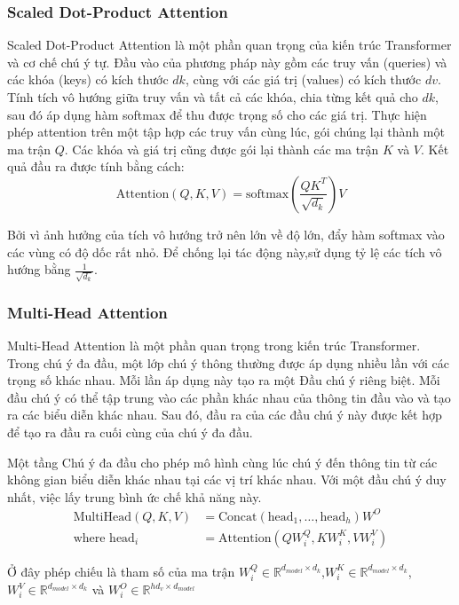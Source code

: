\subsubsection*{Scaled Dot-Product Attention}
Scaled Dot-Product Attention là một phần quan trọng của kiến trúc Transformer và cơ chế chú ý tự. Đầu vào của phương pháp này gồm các truy vấn (queries) và các khóa (keys) có kích thước $dk$, cùng với các giá trị (values) có kích thước $dv$. Tính tích vô hướng giữa truy vấn và tất cả các khóa, chia từng kết quả cho $dk$, sau đó áp dụng hàm softmax để thu được trọng số cho các giá trị. Thực hiện phép attention trên một tập hợp các truy vấn cùng lúc, gói chúng lại thành một ma trận $Q$. Các khóa và giá trị cũng được gói lại thành các ma trận $K$ và $V$. Kết quả đầu ra được tính bằng cách:
\[
    \text{Attention}(Q, K, V) = \text{softmax} (\frac{ QK^T }{ \sqrt{d_k} }) V   
\]

Bởi vì ảnh hưởng của tích vô hướng trở nên lớn về độ lớn, đẩy hàm softmax vào các vùng có độ dốc rất nhỏ.  Để chống lại tác động này,sử dụng tỷ lệ các tích vô hướng bằng \(\frac{1}{\sqrt{d_k}}\).

\subsubsection*{Multi-Head Attention}
Multi-Head Attention là một phần quan trọng trong kiến trúc Transformer. Trong chú ý đa đầu, một lớp chú ý thông thường được áp dụng nhiều lần với các trọng số khác nhau. Mỗi lần áp dụng này tạo ra một Đầu chú ý riêng biệt. Mỗi đầu chú ý có thể tập trung vào các phần khác nhau của thông tin đầu vào và tạo ra các biểu diễn khác nhau. Sau đó, đầu ra của các đầu chú ý này được kết hợp để tạo ra đầu ra cuối cùng của chú ý đa đầu.

Một tầng Chú ý đa đầu cho phép mô hình cùng lúc chú ý đến thông tin từ các không gian biểu diễn khác nhau tại các vị trí khác nhau. Với một đầu chú ý duy nhất, việc lấy trung bình ức chế khả năng này\cite{vaswani2023attention}.
\begin{align*}
    \text{MultiHead}(Q, K, V) &= \text{Concat}(\text{head}_1, \ldots, \text{head}_h)W^O \\
    \text{where head}_i &= \text{Attention}(QW_i^Q, KW_i^K, VW_i^V)
\end{align*}

Ở đây phép chiếu là tham số của ma trận $W_i^Q \in \mathbb{R}^{d_{model} \times d_k}$,$ W_i^K \in \mathbb{R}^{d_{model} \times d_k}$, $W_i^V \in \mathbb{R}^{d_{model} \times d_k}$ và $W_i^O \in \mathbb{R}^{hd_v \times d_{model}}$

